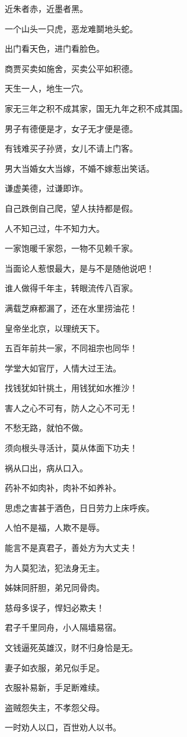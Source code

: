 \documentclass[12pt,oneside]{book}
\begin{document}
近朱者赤，近墨者黑。

一个山头一只虎，恶龙难鬬地头蛇。

出门看天色，进门看脸色。

商贾买卖如施舍，买卖公平如积德。

天生一人，地生一穴。

家无三年之积不成其家，国无九年之积不成其国。

男子有德便是才，女子无才便是德。

有钱难买子孙贤，女儿不请上门客。

男大当婚女大当嫁，不婚不嫁惹出笑话。

谦虚美德，过谦即诈。

自己跌倒自己爬，望人扶持都是假。

人不知己过，牛不知力大。

一家饱暖千家怨，一物不见赖千家。

当面论人惹恨最大，是与不是随他说吧！

谁人做得千年主，转眼流传八百家。

满载芝麻都漏了，还在水里捞油花！

皇帝坐北京，以理统天下。

五百年前共一家，不同祖宗也同华！

学堂大如官厅，人情大过王法。

找钱犹如针挑土，用钱犹如水推沙！

害人之心不可有，防人之心不可无！

不愁无路，就怕不做。

须向根头寻活计，莫从体面下功夫！

祸从口出，病从口入。

药补不如肉补，肉补不如养补。

思虑之害甚于酒色，日日劳力上床呼疾。

人怕不是福，人欺不是辱。

能言不是真君子，善处方为大丈夫！

为人莫犯法，犯法身无主。

姊妹同肝胆，弟兄同骨肉。

慈母多误子，悍妇必欺夫！

君子千里同舟，小人隔墙易宿。

文钱逼死英雄汉，财不归身恰是无。

妻子如衣服，弟兄似手足。

衣服补易新，手足断难续。

盗贼怨失主，不孝怨父母。

一时劝人以口，百世劝人以书。
\end{document}
